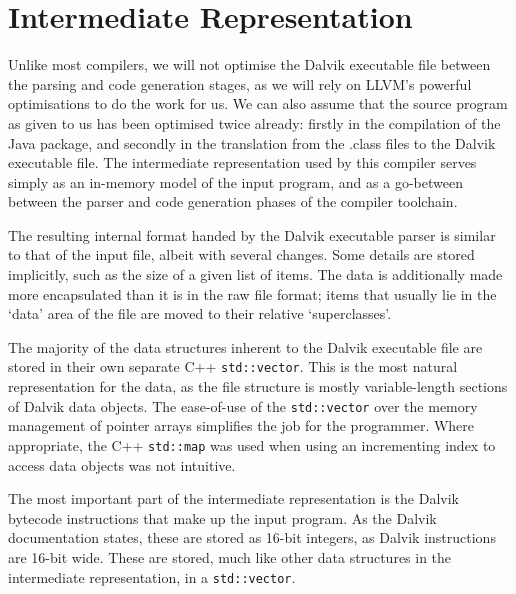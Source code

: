 \section{Intermediate Representation}
\label{sec:irep}

Unlike most compilers, we will not optimise the Dalvik executable file between the parsing and code generation stages, as we will rely on LLVM's powerful optimisations to do the work for us. We can also assume that the source program as given to us has been optimised twice already: firstly in the compilation of the Java package, and secondly in the translation from the .class files to the Dalvik executable file. The intermediate representation used by this compiler serves simply as an in-memory model of the input program, and as a go-between between the parser and code generation phases of the compiler toolchain.

The resulting internal format handed by the Dalvik executable parser is similar to that of the input file, albeit with several changes. Some details are stored implicitly, such as the size of a given list of items. The data is additionally made more encapsulated than it is in the raw file format; items that usually lie in the `data' area of the file are moved to their relative `superclasses'.

The majority of the data structures inherent to the Dalvik executable file are stored in their own separate C++ \verb|std::vector|. This is the most natural representation for the data, as the file structure is mostly variable-length sections of Dalvik data objects. The ease-of-use of the \verb|std::vector| over the memory management of pointer arrays simplifies the job for the programmer. Where appropriate, the C++ \verb|std::map| was used when using an incrementing index to access data objects was not intuitive.

The most important part of the intermediate representation is the Dalvik bytecode instructions that make up the input program. As the Dalvik documentation states, these are stored as 16-bit integers, as Dalvik instructions are 16-bit wide. These are stored, much like other data structures in the intermediate representation, in a \verb|std::vector|.

